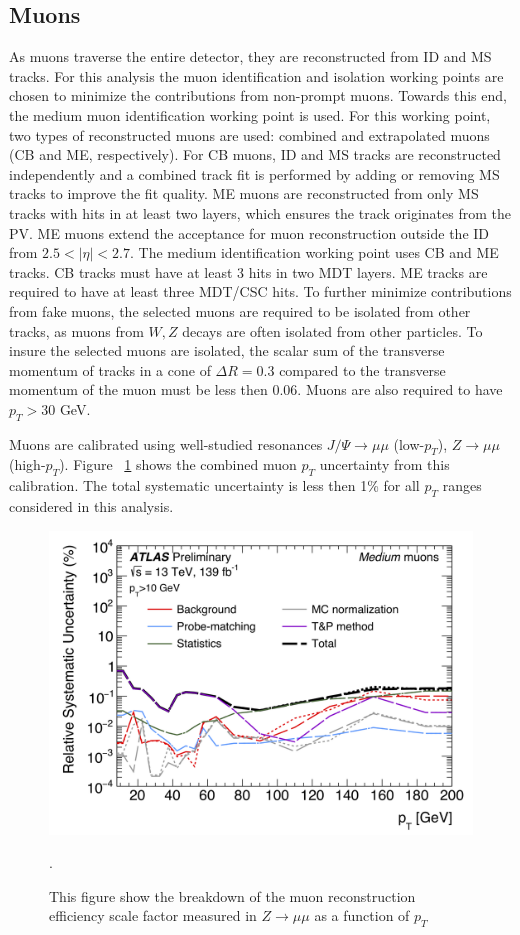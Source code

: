 \subsection{Muons}
As muons traverse the entire detector, they are reconstructed from ID and MS tracks. For this analysis the muon identification and isolation working points are chosen to minimize the contributions from non-prompt muons. Towards this end, the medium muon identification working point is used. For this working point, two types of reconstructed muons are used: combined and extrapolated muons (CB and ME, respectively). For CB muons, ID and MS tracks are reconstructed independently and a combined track fit is performed by adding or removing MS tracks to improve the fit quality. ME muons are reconstructed from only MS tracks with hits in at least two layers, which ensures the track originates from the PV. ME muons extend the acceptance for muon reconstruction outside the ID from $2.5 < |\eta| < 2.7$.
The medium identification working point uses CB and ME tracks. CB tracks must have at least 3 hits in two MDT layers. ME tracks are required to have at least three MDT/CSC hits. To further minimize contributions from fake muons, the selected muons are required to be isolated from other tracks, as muons from $W,Z$ decays are often isolated from other particles. To insure the selected muons are isolated, the scalar sum of the transverse momentum of tracks in a cone of $\Delta R = 0.3$ compared to the transverse momentum of the muon must be less then 0.06. Muons are also required to have $p_{T} > 30$ GeV.

Muons are calibrated using well-studied resonances $J/ \Psi \rightarrow \mu \mu$ (low-$p_T$),  $Z \rightarrow \mu \mu$ (high-$p_{T}$). Figure ~\ref{fig:muon_syst} shows the combined muon $p_{T}$ uncertainty from this calibration. The total systematic uncertainty is less then 1\% for all $p_{T}$ ranges considered in this analysis.


\begin{figure}[h!]
  \centering
  \includegraphics[width=\hsize]{figures/Analysis/muon_syst.png}
  \caption{\cite{muon_calib} {This figure show the breakdown of the muon reconstruction efficiency scale factor measured in $Z \rightarrow \mu \mu$ as a function of $p_{T}$}}. 
  \label{fig:muon_syst}
\end{figure} 
\FloatBarrier

